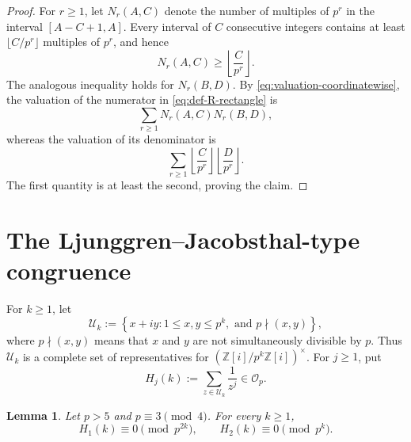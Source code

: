 \documentclass[a4paper,american,11pt]{amsart}
\numberwithin{equation}{section}
\newtheorem{lemma}[theorem]{Lemma}
\theoremstyle{definition}
\newcommand{\Z}{\mathbb Z}
\newcommand{\Op}{\mathcal O_p}
\begin{document}
\begin{proof}
For $r\geq 1$, let $N_r(A,C)$ denote the number of multiples of $p^r$ in the interval $[A-C+1,A]$. Every interval of $C$ consecutive integers contains at least $\lfloor C/p^r\rfloor$ multiples of $p^r$, and hence
\[
N_r(A,C)\geq \left\lfloor\frac{C}{p^r}\right\rfloor.
\]
The analogous inequality holds for $N_r(B,D)$. By \eqref{eq:valuation-coordinatewise}, the valuation of the numerator in \eqref{eq:def-R-rectangle} is
\[
\sum_{r\geq 1}N_r(A,C)N_r(B,D),
\]
whereas the valuation of its denominator is
\[
\sum_{r\geq 1}
\left\lfloor\frac{C}{p^r}\right\rfloor
\left\lfloor\frac{D}{p^r}\right\rfloor.
\]
The first quantity is at least the second, proving the claim.
\end{proof}

\section{The Ljunggren--Jacobsthal-type congruence}\label{sec:ljunggren-proof}

For $k\geq 1$, let
\begin{equation}\label{eq:def-Uk}
\mathcal U_k
:=
\left\{x+iy:1\leq x,y\leq p^k,
\text{ and }p\nmid(x,y)\right\},
\end{equation}
where $p\nmid(x,y)$ means that $x$ and $y$ are not simultaneously divisible by $p$. Thus $\mathcal U_k$ is a complete set of representatives for $(\Z[i]/p^k\Z[i])^{\times}$. For $j\geq 1$, put
\begin{equation}\label{eq:def-Hjk}
H_j(k):=\sum_{z\in\mathcal U_k}\frac{1}{z^j}\in\Op.
\end{equation}

\begin{lemma}\label{lem:power-sums}
Let $p>5$ and $p\equiv 3\pmod 4$. For every $k\geq 1$,
\begin{equation}\label{eq:H-valuations}
H_1(k)\equiv 0\pmod{p^{2k}},
\qquad
H_2(k)\equiv 0\pmod{p^k}.
\end{equation}
\end{lemma}
\end{document}
